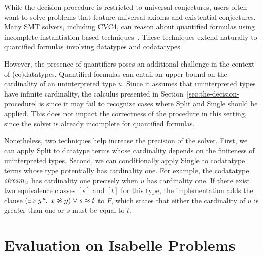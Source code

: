 \documentclass[smallcondensed,draft]{svjour3}
\newcommand\typ[1]{^{\vthinspace #1}}
\newcommand\ty[1]{\textit{#1}}
\newcommand{\rn}[1]{\textsf{#1}}
\newcommand{\teq}{\approx}
\newcommand{\ec}[1]{[#1]}
\newcommand\vthinspace{\kern+0.083333em}
\begin{document}
While the decision procedure is restricted to universal conjectures, users often
want to solve problems that feature universal axioms and existential
conjectures.
Many SMT solvers, including CVC4, can reason about quantified formulas using incomplete 
instantiation-based 
techniques~\cite{MouraBjoerner07,ReynoldsTinelliMoura14}.
These techniques extend naturally to quantified
formulas involving datatypes and codatatypes.

However, the presence of quantifiers poses an additional challenge in
the context of (co)datatypes. Quantified formulas can entail an upper bound on
the cardinality of an uninterpreted type $\ty{u}$.
Since it assumes that uninterpreted types have infinite cardinality, the calculus
presented in Section~\ref{sec:the-decision-procedure} is 
since it may fail to recognize cases where \rn{Split} and \rn{Single} should be
applied.
This does not %
impact the correctness of the procedure in this setting,
since %
the solver is already incomplete for quantified formulas.

Nonetheless, two techniques help increase the precision of the solver.
First, we can apply \rn{Split} to datatype terms whose cardinality depends on the finiteness of
uninterpreted types.
Second, we can conditionally apply \rn{Single} to codatatype terms whose type
potentially has cardinality one.
For example, the codatatype $\ty{stream}_{\vthinspace\ty{u}}$ %
has cardinality one precisely when $\ty{u}$ has cardinality one.
If there exist two equivalence classes $\ec{s}$ and $\ec{t}$ for this type,
the implementation adds the clause %
$(\exists x\;y\typ{\ty{u}}.\;\, x \not\teq y ) \mathrel\vee s \teq t$ to $F\!$,
which states that either the cardinality of $\ty{u}$ is greater than one or
$s$ must be equal to $t$.


\section{Evaluation on Isabelle Problems}
\label{sec:evaluation-on-isabelle-problems}
\end{document}
